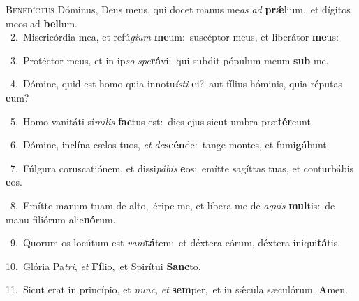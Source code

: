 \lettrine{\initial\textcolor{\initialcolor}{B}}{enedíctus} Dóminus, Deus meus, qui docet manus me\textit{as} \textit{ad} \textbf{prǽ}\-lium,~\star et dígitos meos ad \textbf{bel}\-lum.\\
{\numbfont\textcolor{\numbcolor}{~2.}}~Misericórdia mea, et refú\-\textit{gi}\-\textit{um} \textbf{me}\-um:~\star suscéptor meus, et liberátor \textbf{me}\-us:\par
{\numbfont\textcolor{\numbcolor}{~3.}}~Protéctor meus, et in ip\textit{so} \textit{spe}\-\textbf{rá}vi:~\star qui subdit pópulum meum \textbf{sub} me.\par
{\numbfont\textcolor{\numbcolor}{~4.}}~Dómine, quid est homo quia innotu\-\textit{ís}\-\textit{ti} \textbf{e}\-i?~\star aut fílius hóminis, quia réputas \textbf{e}\-um?\par
{\numbfont\textcolor{\numbcolor}{~5.}}~Homo vanitáti sí\-\textit{mi}\-\textit{lis} \textbf{fac}\-tus est:~\star dies ejus sicut umbra præ\-\textbf{tér}\-eunt.\par
{\numbfont\textcolor{\numbcolor}{~6.}}~Dómine, inclína cælos tuos, \textit{et} \textit{de}\-\textbf{scén}de:~\star tange montes, et fumi\-\textbf{gá}\-bunt.\par
{\numbfont\textcolor{\numbcolor}{~7.}}~Fúlgura coruscatiónem, et dissi\-\textit{pá}\-\textit{bis} \textbf{e}\-os:~\star emítte sagíttas tuas, et conturbábis \textbf{e}\-os.\par
{\numbfont\textcolor{\numbcolor}{~8.}}~Emítte manum tuam de alto,~\dagger éripe me, et líbera me de \textit{a}\-\textit{quis} \textbf{mul}\-tis:~\star de manu filiórum alie\-\textbf{nó}\-rum.\par
{\numbfont\textcolor{\numbcolor}{~9.}}~Quorum os locútum est \textit{va}\-\textit{ni}\textbf{tá}tem:~\star et déxtera eórum, déxtera iniqui\-\textbf{tá}\-tis.\par
{\numbfont\textcolor{\numbcolor}{10.}}~Glória Pa\-\textit{tri}\-, \textit{et} \textbf{Fí}\-lio,~\star et Spirítui \textbf{Sanc}\-to.\par
{\numbfont\textcolor{\numbcolor}{11.}}~Sicut erat in princípio, et \textit{nunc}\-, \textit{et} \textbf{sem}\-per,~\star et in sǽcula sæculórum. \textbf{A}\-men.\par
